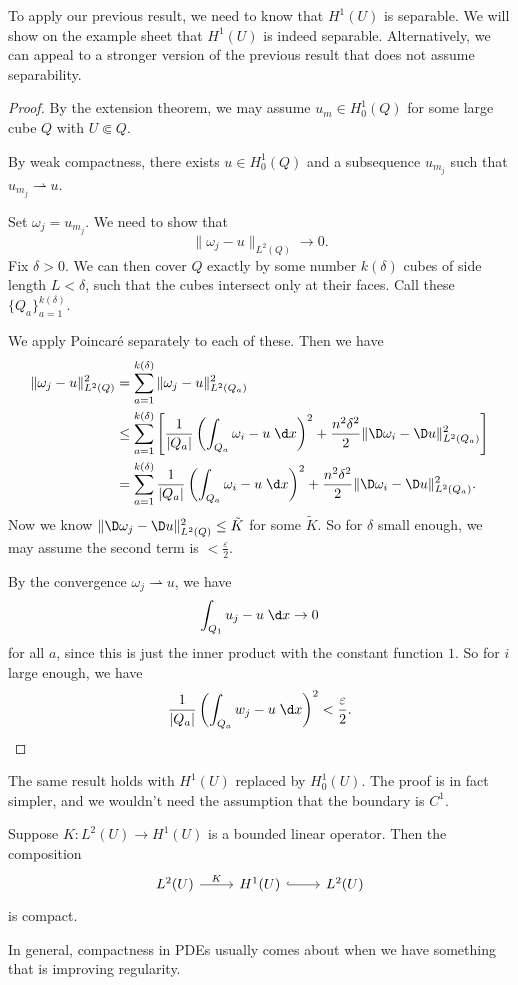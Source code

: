 \documentclass[a4paper]{article}
\begin{document}
To apply our previous result, we need to know that $H^1(U)$ is separable. We will show on the example sheet that $H^1(U)$ is indeed separable. Alternatively, we can appeal to a stronger version of the previous result that does not assume separability.
\begin{proof}
  By the extension theorem, we may assume $u_m \in H^1_0(Q)$ for some large cube $Q$ with $U \Subset Q$.

  By weak compactness, there exists $u \in H_0^1(Q)$ and a subsequence $u_{m_j}$ such that $u_{m_j} \rightharpoonup u$.

  Set $\omega_j = u_{m_j}$. We need to show that
  \[
    \|\omega_j - u\|_{L^2(Q)} \to 0.
  \]
  Fix $\delta > 0$. We can then cover $Q$ exactly by some number $k(\delta)$ cubes of side length $L < \delta$, such that the cubes intersect only at their faces. Call these $\{Q_a\}_{a = 1}^{k(\delta)}$.

  We apply Poincar\'e separately to each of these. Then we have
  \begin{align*}
    \|\omega_j - u\|_{L^2(Q)}^2 &= \sum_{a = 1}^{k(\delta)} \|\omega_j - u\|_{L^2(Q_a)}^2\\
    &\leq \sum_{a = 1}^{k(\delta)} \left[\frac{1}{|Q_a|} \left(\int_{Q_a} \omega_i - u\;\d x\right)^2 + \frac{n^2 \delta^2}{2} \|\D \omega_i - \D u\|^2_{L^2(Q_a)}\right]\\
    &= \sum_{a = 1}^{k(\delta)} \frac{1}{|Q_a|} \left(\int_{Q_a} \omega_i - u\;\d x\right)^2 + \frac{n^2 \delta^2}{2} \|\D \omega_i - \D u\|^2_{L^2(Q_a)}.
  \end{align*}
  Now we know $\|\D \omega_j - \D u\|_{L^2(Q)}^2 \leq \tilde{K}$ for some $\tilde{K}$. So for $\delta$ small enough, we may assume the second term is $< \frac{\varepsilon}{2}$.

  By the convergence $\omega_j \rightharpoonup u$, we have
  \[
    \int_{Q_1} u_j - u\;\d x \to 0
  \]
  for all $a$, since this is just the inner product with the constant function $1$. So for $i$ large enough, we have
  \[
    \frac{1}{|Q_a|} \left(\int_{Q_a} w_j - u \;\d x\right)^2 < \frac{\varepsilon}{2}.
  \]
\end{proof}

The same result holds with $H^1(U)$ replaced by $H^1_0(U)$. The proof is in fact simpler, and we wouldn't need the assumption that the boundary is $C^1$.

\begin{cor}
  Suppose $K: L^2(U) \to H^1(U)$ is a bounded linear operator. Then the composition
  \[
    \begin{tikzcd}
      L^2(U) \ar[r, "K"] & H^1(U) \ar[r, hook] & L^2(U)
    \end{tikzcd}
  \]
  is compact.
\end{cor}
In general, compactness in PDEs usually comes about when we have something that is improving regularity.
\end{document}
